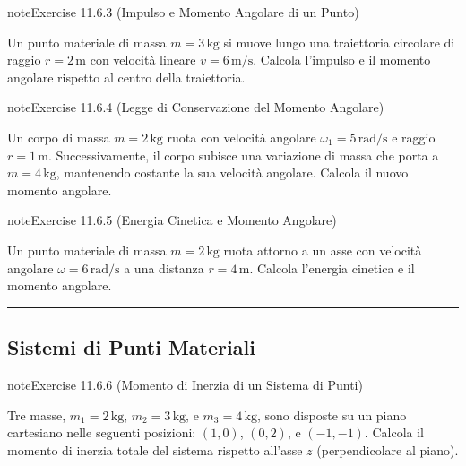 \documentclass[letterpaper,10pt,italian]{jupyterBook}
\begin{document}
\begin{sphinxadmonition}{note}{Exercise 11.6.3 (Impulso e Momento Angolare di un Punto)}



\sphinxAtStartPar
Un punto materiale di massa \(m = 3 \, \text{kg}\) si muove lungo una traiettoria circolare di raggio \(r = 2 \, \text{m}\) con velocità lineare \(v = 6 \, \text{m/s}\). Calcola l’impulso e il momento angolare rispetto al centro della traiettoria.
\end{sphinxadmonition}
 \label{exercise:ch/mechanics/inertia-problems-exercise-3}

\begin{sphinxadmonition}{note}{Exercise 11.6.4 (Legge di Conservazione del Momento Angolare)}



\sphinxAtStartPar
Un corpo di massa \(m = 2 \, \text{kg}\) ruota con velocità angolare \(\omega_1 = 5 \, \text{rad/s}\) e raggio \(r = 1 \, \text{m}\). Successivamente, il corpo subisce una variazione di massa che porta a \(m = 4 \, \text{kg}\), mantenendo costante la sua velocità angolare. Calcola il nuovo momento angolare.
\end{sphinxadmonition}
 \label{exercise:ch/mechanics/inertia-problems-exercise-4}

\begin{sphinxadmonition}{note}{Exercise 11.6.5 (Energia Cinetica e Momento Angolare)}



\sphinxAtStartPar
Un punto materiale di massa \(m = 2 \, \text{kg}\) ruota attorno a un asse con velocità angolare \(\omega = 6 \, \text{rad/s}\) a una distanza \(r = 4 \, \text{m}\). Calcola l’energia cinetica e il momento angolare.
\end{sphinxadmonition}


\bigskip\hrule\bigskip



\subsection{Sistemi di Punti Materiali}
\label{\detokenize{ch/mechanics/inertia-problems:sistemi-di-punti-materiali}} \label{exercise:ch/mechanics/inertia-problems-exercise-5}

\begin{sphinxadmonition}{note}{Exercise 11.6.6 (Momento di Inerzia di un Sistema di Punti)}



\sphinxAtStartPar
Tre masse, \(m_1 = 2 \, \text{kg}\), \(m_2 = 3 \, \text{kg}\), e \(m_3 = 4 \, \text{kg}\), sono disposte su un piano cartesiano nelle seguenti posizioni: \((1, 0)\), \((0, 2)\), e \((-1, -1)\). Calcola il momento di inerzia totale del sistema rispetto all’asse \(z\) (perpendicolare al piano).
\end{sphinxadmonition}
 \label{exercise:ch/mechanics/inertia-problems-exercise-6}
\end{document}
